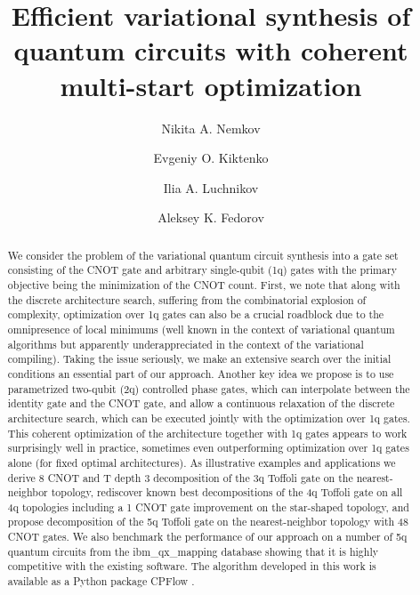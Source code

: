 \documentclass[twocolumn, amsfonts, amssymb, aps, nofootinbib]{revtex4-2}
\newcommand{\CX}{\textsf{CNOT }}
\newcommand{\T}{\textsf{T }}
\newcommand{\package}[1]{\textrm {#1 }}
\newcommand{\cpflow}{\package{CPFlow}}
\begin{document}
\title{Efficient variational synthesis of quantum circuits with coherent multi-start optimization}

\author{Nikita A. Nemkov}
\author{Evgeniy O. Kiktenko}
\author{Ilia A. Luchnikov}
\author{Aleksey K. Fedorov}

\begin{abstract}
We consider the problem of the variational quantum circuit synthesis into a gate set consisting of the \CX gate and arbitrary single-qubit (1q) gates with the primary objective being the minimization of the \CX count. First, we note that along with the discrete architecture search, suffering from the combinatorial explosion of complexity, optimization over 1q gates can also be a crucial roadblock due to the omnipresence of local minimums (well known in the context of variational quantum algorithms but apparently underappreciated in the context of the variational compiling). Taking the issue seriously, we make an extensive search over the initial conditions an essential part of our approach.
Another key idea we propose is to use parametrized two-qubit (2q) controlled phase gates, which can interpolate between the identity gate and the \CX gate, and allow a continuous relaxation of the discrete architecture search, which can be executed jointly with the optimization over 1q gates. This coherent optimization of the architecture together with 1q gates appears to work surprisingly well in practice, sometimes even outperforming optimization over 1q gates alone (for fixed optimal architectures).
As illustrative examples and applications we derive 8 \CX and \T depth 3 decomposition of the 3q Toffoli gate on the nearest-neighbor topology, rediscover known best decompositions of the 4q Toffoli gate on all 4q topologies including a  1 \CX gate improvement on the star-shaped topology, and propose decomposition of the 5q Toffoli gate on the nearest-neighbor topology with 48 \CX gates. We also benchmark the performance of our approach on a number of 5q quantum circuits from the ibm\_qx\_mapping database showing that it is highly competitive with the existing software. The algorithm developed in this work is available as a Python package \cpflow.
\end{abstract}
\end{document}
